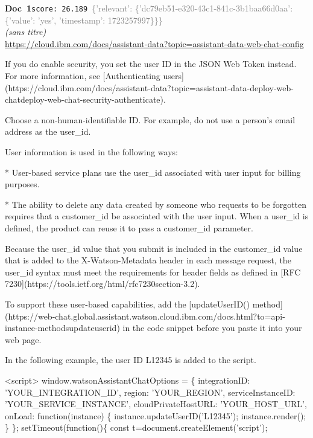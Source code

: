 \documentclass[a4paper,11pt]{article}
\begin{document}
\begin{docenv}
{\footnotesize\textcolor{doccolor}{\textbf{Doc~1}}}\hfill{\tiny\texttt{score:~26.189}}\ {\tiny\textcolor{gray}{\{'relevant': \{'dc79eb51-e320-43c1-841c-3b1baa66d0aa': \{'value': 'yes', 'timestamp': 1723257997\}\}\}}}\\[3pt]
{\small\textit{(sans titre)}}\\[2pt]
{\tiny\url{https://cloud.ibm.com/docs/assistant-data?topic=assistant-data-web-chat-config}}\\[4pt]
{\footnotesize 
If you do enable security, you set the user ID in the JSON Web Token instead. For more information, see [Authenticating users](https://cloud.ibm.com/docs/assistant-data?topic=assistant-data-deploy-web-chatdeploy-web-chat-security-authenticate).

Choose a non-human-identifiable ID. For example, do not use a person's email address as the user\_id.

User information is used in the following ways:



* User-based service plans use the user\_id associated with user input for billing purposes.





* The ability to delete any data created by someone who requests to be forgotten requires that a customer\_id be associated with the user input. When a user\_id is defined, the product can reuse it to pass a customer\_id parameter.

Because the user\_id value that you submit is included in the customer\_id value that is added to the X-Watson-Metadata header in each message request, the user\_id syntax must meet the requirements for header fields as defined in [RFC 7230](https://tools.ietf.org/html/rfc7230section-3.2).



To support these user-based capabilities, add the [updateUserID() method](https://web-chat.global.assistant.watson.cloud.ibm.com/docs.html?to=api-instance-methodsupdateuserid) in the code snippet before you paste it into your web page.

In the following example, the user ID L12345 is added to the script.

<script>
window.watsonAssistantChatOptions = \{
integrationID: 'YOUR\_INTEGRATION\_ID',
region: 'YOUR\_REGION',
serviceInstanceID: 'YOUR\_SERVICE\_INSTANCE',
cloudPrivateHostURL: 'YOUR\_HOST\_URL',
onLoad: function(instance) \{
instance.updateUserID('L12345');
instance.render();
\}
\};
setTimeout(function()\{
const t=document.createElement('script');}
\end{docenv}
\end{document}

